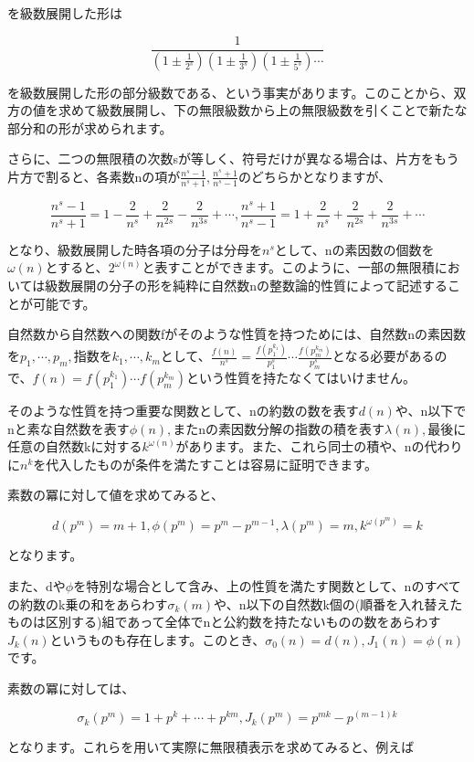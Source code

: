 \documentclass[a4paper]{jsarticle}
\theoremstyle{break}
\begin{document}
を級数展開した形は

\[\frac{1}{\left( 1\pm \frac{1}{2^s} \right)\left( 1\pm \frac{1}{3^s} \right)\left( 1\pm\frac{1}{5^s} \right)\cdots}\]

を級数展開した形の部分級数である、という事実があります。このことから、双方の値を求めて級数展開し、下の無限級数から上の無限級数を引くことで新たな部分和の形が求められます。

さらに、二つの無限積の次数sが等しく、符号だけが異なる場合は、片方をもう片方で割ると、各素数nの項が$\displaystyle\frac{n^s-1}{n^s+1},\frac{n^s+1}{n^s-1}$のどちらかとなりますが、

\[\frac{n^s-1}{n^s+1}=1-\frac{2}{n^s}+\frac{2}{n^{2s}}-\frac{2}{n^{3s}}+\cdots,\frac{n^s+1}{n^s-1}=1+\frac{2}{n^s}+\frac{2}{n^{2s}}+\frac{2}{n^{3s}}+\cdots\]

となり、級数展開した時各項の分子は分母を$n^s$として、nの素因数の個数を$\omega(n)$とすると、$2^{\omega(n)}$と表すことができます。このように、一部の無限積においては級数展開の分子の形を純粋に自然数nの整数論的性質によって記述することが可能です。

自然数から自然数への関数fがそのような性質を持つためには、自然数nの素因数を$p_1,\cdots,p_m,$指数を$k_1,\cdots,k_m$として、$\displaystyle\frac{f(n)}{n^s}=\frac{f(p_1^{k_1})}{p_1^s}\cdots\frac{f(p_m^{k_m})}{p_m^s}$となる必要があるので、$f(n)=f(p_1^{k_1})\cdots f(p_m^{k_m})$という性質を持たなくてはいけません。

そのような性質を持つ重要な関数として、nの約数の数を表す$d(n)$や、n以下でnと素な自然数を表す$\phi(n),$またnの素因数分解の指数の積を表す$\lambda(n),$最後に任意の自然数kに対する$k^{\omega(n)}$があります。また、これら同士の積や、nの代わりに$n^k$を代入したものが条件を満たすことは容易に証明できます。

素数の冪に対して値を求めてみると、

\[d(p^m)=m+1,\phi(p^m)=p^m-p^{m-1},\lambda(p^m)=m,k^{\omega(p^m)}=k\]

となります。

また、dや$\phi$を特別な場合として含み、上の性質を満たす関数として、nのすべての約数のk乗の和をあらわす$\sigma_k(m)$や、n以下の自然数k個の(順番を入れ替えたものは区別する)組であって全体でnと公約数を持たないものの数をあらわす$J_k(n)$というものも存在します。このとき、$\sigma_0(n)=d(n),J_1(n)=\phi(n)$です。

素数の冪に対しては、

\[\sigma_k(p^m)=1+p^k+\cdots+p^{km},J_k(p^m)=p^{mk}-p^{(m-1)k}\]

となります。これらを用いて実際に無限積表示を求めてみると、例えば
\end{document}
